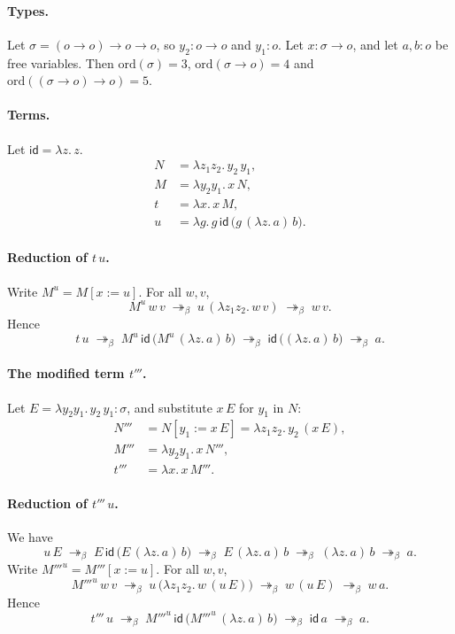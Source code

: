 \documentclass{article}
\newcommand{\red}{\twoheadrightarrow_\beta}
\newcommand{\id}{\mathsf{id}}
\begin{document}
\paragraph{Types.}
Let $\sigma = (o\to o)\to o\to o$, so $y_2 : o\to o$ and $y_1 : o$.
Let $x : \sigma\to o$, and let $a, b : o$ be free variables.
Then $\mathrm{ord}(\sigma) = 3$, $\mathrm{ord}(\sigma\to o) = 4$ and
$\mathrm{ord}((\sigma\to o)\to o) = 5$.

\paragraph{Terms.}
Let $\id = \lambda z.\,z$.
\begin{align*}
  N &= \lambda z_1 z_2.\, y_2\, y_1, \\
  M &= \lambda y_2 y_1.\, x\, N, \\
  t &= \lambda x.\, x\, M, \\
  u &= \lambda g.\, g\, \id\, \bigl(g\, (\lambda z.\,a)\, b\bigr).
\end{align*}

\paragraph{Reduction of $t\,u$.}
Write $M^u = M[x := u]$. For all $w, v$,
\[
  M^u\, w\, v \;\red\; u\, (\lambda z_1 z_2.\, w\, v) \;\red\; w\, v .
\]
Hence
\[
  t\,u \;\red\; M^u\, \id\, \bigl(M^u\, (\lambda z.\,a)\, b\bigr)
  \;\red\; \id\, \bigl((\lambda z.\,a)\, b\bigr) \;\red\; a .
\]

\paragraph{The modified term $t'''$.}
Let $E = \lambda y_2 y_1.\, y_2\, y_1 : \sigma$, and substitute $x\,E$ for $y_1$ in $N$:
\begin{align*}
  N''' &= N[y_1 := x\,E] = \lambda z_1 z_2.\, y_2\, (x\, E), \\
  M''' &= \lambda y_2 y_1.\, x\, N''', \\
  t''' &= \lambda x.\, x\, M'''.
\end{align*}

\paragraph{Reduction of $t'''\,u$.}
We have
\[
  u\,E \;\red\; E\, \id\, \bigl(E\, (\lambda z.\,a)\, b\bigr)
  \;\red\; E\, (\lambda z.\,a)\, b \;\red\; (\lambda z.\,a)\, b \;\red\; a .
\]
Write $M'''^u = M'''[x := u]$. For all $w, v$,
\[
  M'''^u\, w\, v \;\red\; u\, \bigl(\lambda z_1 z_2.\, w\, (u\,E)\bigr) \;\red\; w\,(u\,E) \;\red\; w\, a .
\]
Hence
\[
  t'''\,u \;\red\; M'''^u\, \id\, \bigl(M'''^u\, (\lambda z.\,a)\, b\bigr)
  \;\red\; \id\, a \;\red\; a .
\]
\end{document}
